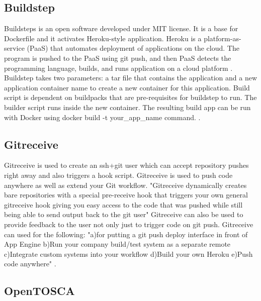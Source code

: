 {     \pv
     
\subsection{Buildstep}
     
     Buildsteps is an open software developed under MIT license. 
     It is a base for Dockerfile and it activates Heroku-style 
     application. Heroku is a platform-as-service (PaaS) that 
     automates deployment of applications on the cloud. The 
     program is pushed to the PaaS using git push, and then 
     PaaS detects the programming language, builds, and runs 
     application on a cloud platform \cite{plassnig15}.
     Buildstep takes two parameters: a tar file that contains 
     the application and a new application container name to 
     create a new container for this application. Build script 
     is dependent on buildpacks that are pre-requisites for 
     buildstep to run. The builder script runs inside the new 
     container.  The resulting build app can be run with Docker 
     using docker build -t your\_app\_name command.
     \cite{github-buildstep}. 

\subsection{Gitreceive}

     Gitreceive is used to create an ssh+git user which can accept
     repository pushes right away and also triggers a hook
     script. Gitreceive is used to push code anywhere as well as
     extend your Git workflow. "Gitreceive dynamically creates bare
     repositories with a special pre-receive hook that triggers your
     own general gitreceive hook giving you easy access to the code
     that was pushed while still being able to send output back to the
     git user" Gitreceive can also be used to provide feedback to the
     user not only just to trigger code on git push.  Gitreceive can
     used for the following: "a)for putting a git push deploy
     interface in front of App Engine b)Run your company build/test
     system as a separate remote c)Integrate custom systems into your
     workflow d)Build your own Heroku e)Push code
     anywhere" \cite{lindsay2016}.
     
\subsection{OpenTOSCA}

}
